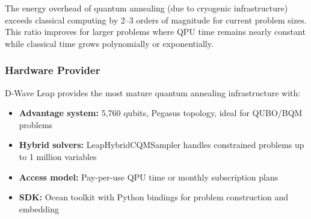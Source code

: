 \documentclass{oqireport}
\begin{document}
The energy overhead of quantum annealing (due to cryogenic infrastructure) exceeds classical computing by 2--3 orders of magnitude for current problem sizes. This ratio improves for larger problems where QPU time remains nearly constant while classical time grows polynomially or exponentially.

\subsubsection{Hardware Provider}



D-Wave Leap provides the most mature quantum annealing infrastructure \cite{dwave_leap} with:
\begin{itemize}
    \item \textbf{Advantage system:} 5,760 qubits, Pegasus topology, ideal for QUBO/BQM problems \cite{boothby2020pegasus}
    \item \textbf{Hybrid solvers:} LeapHybridCQMSampler handles constrained problems up to 1 million variables \cite{dwave_hybrid_solver}
    \item \textbf{Access model:} Pay-per-use QPU time or monthly subscription plans
    \item \textbf{SDK:} Ocean toolkit with Python bindings for problem construction and embedding \cite{dwave_ocean}
\end{itemize}






\end{document}
